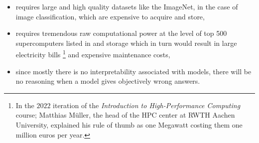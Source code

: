 \begin{itemize}
  \item requires large and high quality datasets like the ImageNet\cite{Deng2009}, in the case of image classification, which are expensive to acquire and store,
  \item requires tremendous raw computational power at the level of top 500 supercomputers listed in \cite{Meuer} and 
  storage which in turn would result in large electricity bills
  \footnote{In the $2022$ iteration of the \emph{Introduction to High-Performance Computing} course; Matthias M\"{u}ller, the head of 
  the \ac{HPC} center at RWTH Aachen University, explained his rule of thumb as one Megawatt costing them one million 
  euros per year.} and expensive maintenance costs,
  \item since mostly there is no interpretability associated with models, there will be no reasoning when a model gives objectively wrong answers. 
\end{itemize}

